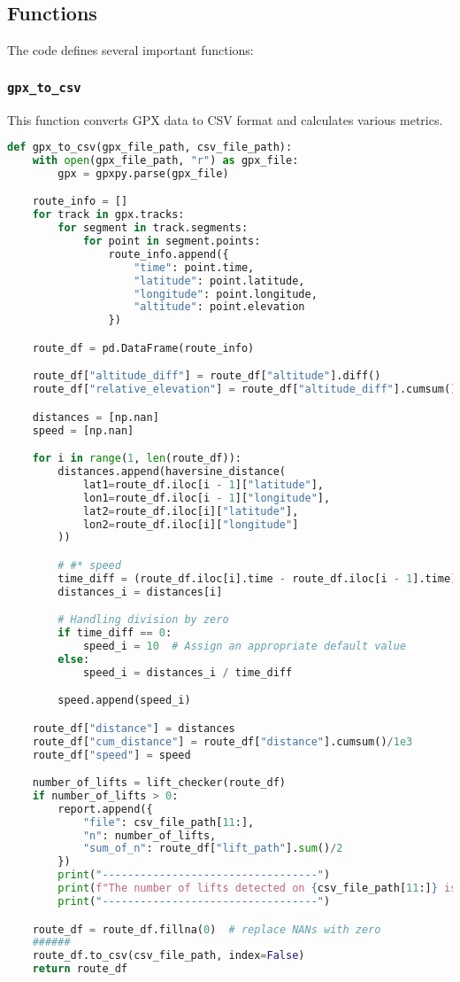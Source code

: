 \subsection{Functions}

The code defines several important functions:

\subsubsection{\texttt{gpx\_to\_csv}}

This function converts GPX data to CSV format and calculates various metrics.

\begin{lstlisting}[language=Python]
def gpx_to_csv(gpx_file_path, csv_file_path):
    with open(gpx_file_path, "r") as gpx_file:
        gpx = gpxpy.parse(gpx_file)

    route_info = []
    for track in gpx.tracks:
        for segment in track.segments:
            for point in segment.points:
                route_info.append({
                    "time": point.time,
                    "latitude": point.latitude,
                    "longitude": point.longitude,
                    "altitude": point.elevation
                })

    route_df = pd.DataFrame(route_info)

    route_df["altitude_diff"] = route_df["altitude"].diff()
    route_df["relative_elevation"] = route_df["altitude_diff"].cumsum()

    distances = [np.nan]
    speed = [np.nan]

    for i in range(1, len(route_df)):
        distances.append(haversine_distance(
            lat1=route_df.iloc[i - 1]["latitude"],
            lon1=route_df.iloc[i - 1]["longitude"],
            lat2=route_df.iloc[i]["latitude"],
            lon2=route_df.iloc[i]["longitude"]
        ))

        # #* speed
        time_diff = (route_df.iloc[i].time - route_df.iloc[i - 1].time).seconds
        distances_i = distances[i]

        # Handling division by zero
        if time_diff == 0:
            speed_i = 10  # Assign an appropriate default value
        else:
            speed_i = distances_i / time_diff

        speed.append(speed_i)

    route_df["distance"] = distances
    route_df["cum_distance"] = route_df["distance"].cumsum()/1e3
    route_df["speed"] = speed

    number_of_lifts = lift_checker(route_df)
    if number_of_lifts > 0:
        report.append({
            "file": csv_file_path[11:],
            "n": number_of_lifts,
            "sum_of_n": route_df["lift_path"].sum()/2
        })
        print("----------------------------------")
        print(f"The number of lifts detected on {csv_file_path[11:]} is {number_of_lifts}")
        print("----------------------------------")

    route_df = route_df.fillna(0)  # replace NANs with zero
    ######
    route_df.to_csv(csv_file_path, index=False)
    return route_df
\end{lstlisting}

